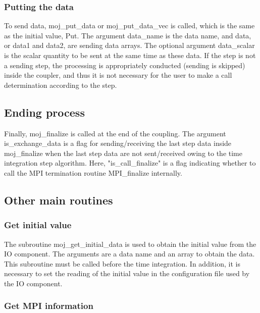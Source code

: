 \hypertarget{putting-the-data}{%
\subsubsection{Putting the data}\label{putting-the-data}}

To send data, moj\_put\_data or moj\_put\_data\_vec is called, which is
the same as the initial value, Put. The argument data\_name is the data
name, and data, or data1 and data2, are sending data arrays. The
optional argument data\_scalar is the scalar quantity to be sent at the
same time as these data. If the step is not a sending step, the
processing is appropriately conducted (sending is skipped) inside the
coupler, and thus it is not necessary for the user to make a call
determination according to the step.

\hypertarget{ending-process}{%
\subsection{Ending process}\label{ending-process}}

Finally, moj\_finalize is called at the end of the coupling. The
argument is\_exchange\_data is a flag for sending/receiving the last
step data inside moj\_finalize when the last step data are not
sent/received owing to the time integration step algorithm. Here,
"is\_call\_finalize" is a flag indicating whether to call the MPI
termination routine MPI\_finalize internally.

\hypertarget{other-main-routines}{%
\subsection{Other main routines}\label{other-main-routines}}

\hypertarget{get-initial-value}{%
\subsubsection{Get initial value}\label{get-initial-value}}

The subroutine moj\_get\_initial\_data is used to obtain the initial
value from the IO component. The arguments are a data name and an array
to obtain the data. This subroutine must be called before the time
integration. In addition, it is necessary to set the reading of the
initial value in the configuration file used by the IO component.

\hypertarget{get-mpi-information-1}{%
\subsubsection{Get MPI information}\label{get-mpi-information-1}}

